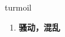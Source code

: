 
\begin{frame}
{\huge turmoil}
\begin{center}
\begin{enumerate}\Large
  \item \textbf{骚动，混乱}
\end{enumerate}
\end{center}
\end{frame}
